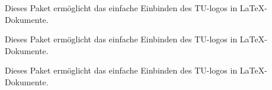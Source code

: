 \documentclass{scrartcl}
\begin{document}
Dieses Paket ermöglicht das einfache Einbinden des TU-logos in
\LaTeX-Dokumente.

{\sffamily Dieses Paket ermöglicht das einfache Einbinden des TU-logos in
\LaTeX-Dokumente.}

{\selectfont Dieses Paket ermöglicht das
einfache Einbinden des TU-logos in
\LaTeX-Dokumente.}
\end{document}
